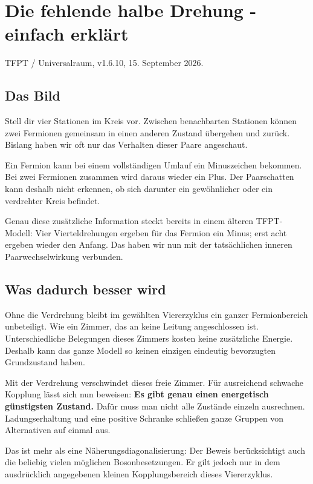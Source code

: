 \documentclass[
  ngerman,
  10pt,
  a4paper,
]{article}
\author{}
\date{}
\begin{document}
\section{Die fehlende halbe Drehung - einfach
erklärt}\label{die-fehlende-halbe-drehung---einfach-erkluxe4rt}

TFPT / Universalraum, v1.6.10, 15. September 2026.

\subsection{Das Bild}\label{das-bild}

Stell dir vier Stationen im Kreis vor. Zwischen benachbarten Stationen
können zwei Fermionen gemeinsam in einen anderen Zustand übergehen und
zurück. Bislang haben wir oft nur das Verhalten dieser Paare angeschaut.

Ein Fermion kann bei einem vollständigen Umlauf ein Minuszeichen
bekommen. Bei zwei Fermionen zusammen wird daraus wieder ein Plus. Der
Paarschatten kann deshalb nicht erkennen, ob sich darunter ein
gewöhnlicher oder ein verdrehter Kreis befindet.

Genau diese zusätzliche Information steckt bereits in einem älteren
TFPT-Modell: Vier Vierteldrehungen ergeben für das Fermion ein Minus;
erst acht ergeben wieder den Anfang. Das haben wir nun mit der
tatsächlichen inneren Paarwechselwirkung verbunden.

\subsection{Was dadurch besser wird}\label{was-dadurch-besser-wird}

Ohne die Verdrehung bleibt im gewählten Viererzyklus ein ganzer
Fermionbereich unbeteiligt. Wie ein Zimmer, das an keine Leitung
angeschlossen ist. Unterschiedliche Belegungen dieses Zimmers kosten
keine zusätzliche Energie. Deshalb kann das ganze Modell so keinen
einzigen eindeutig bevorzugten Grundzustand haben.

Mit der Verdrehung verschwindet dieses freie Zimmer. Für ausreichend
schwache Kopplung lässt sich nun beweisen: \textbf{Es gibt genau einen
energetisch günstigsten Zustand.} Dafür muss man nicht alle Zustände
einzeln ausrechnen. Ladungserhaltung und eine positive Schranke
schließen ganze Gruppen von Alternativen auf einmal aus.

Das ist mehr als eine Näherungsdiagonalisierung: Der Beweis
berücksichtigt auch die beliebig vielen möglichen Bosonbesetzungen. Er
gilt jedoch nur in dem ausdrücklich angegebenen kleinen Kopplungsbereich
dieses Viererzyklus.
\end{document}
